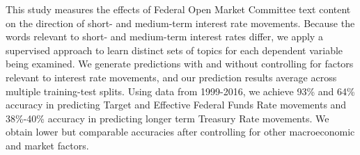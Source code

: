 This study measures the effects of Federal Open Market Committee text content on the direction of short- and medium-term interest rate movements. Because the words relevant to short- and medium-term interest rates differ, we apply a supervised approach to learn distinct sets of topics for each dependent variable being examined. We generate predictions with and without controlling for factors relevant to interest rate movements, and our prediction results average across multiple training-test splits. Using data from 1999-2016, we achieve 93\% and 64\% accuracy in predicting Target and Effective Federal Funds Rate movements and 38\%-40\% accuracy in predicting longer term Treasury Rate movements. We obtain lower but comparable accuracies after controlling for other macroeconomic and market factors.
